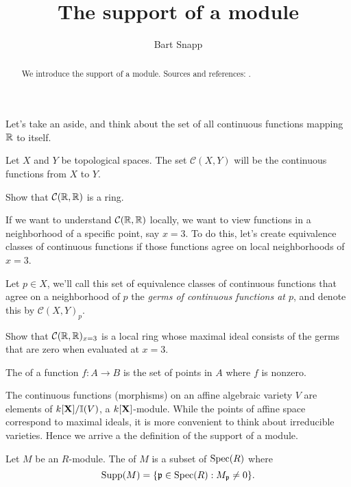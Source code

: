 \documentclass{ximera}
\author{Bart Snapp}
\title{The support of a module}
\begin{document}
\begin{abstract}
  We introduce the support of a module. Sources and references:
  \cite{AM1969, mR1995}.
\end{abstract}
\maketitle

Let's take an aside, and think about the set of all continuous
functions mapping $\mathbb R$ to itself.

\begin{definition}
  Let $X$ and $Y$ be topological spaces. The set $\mathcal{C}(X,Y)$
  will be the continuous functions from $X$ to $Y$.
\end{definition}

\begin{exercise}
  Show that $\mathcal{C}(\mathbb R,\mathbb R)$ is a ring.
\end{exercise}

If we want to understand $\mathcal{C}(\mathbb R,\mathbb R)$ locally, we want to view
functions in a neighborhood of a specific point, say $x=3$. To do
this, let's create equivalence classes of continuous functions if
those functions agree on local neighborhoods of $x=3$.

\begin{definition}
  Let $p\in X$, we'll call this set of equivalence classes of
  continuous functions that agree on a neighborhood of $p$ the
  \textit{germs of continuous functions at $p$}, and denote this by
  $\mathcal{C}(X,Y)_p$.
\end{definition}


\begin{exercise}
  Show that $\mathcal{C}(\mathbb R,\mathbb R)_{x=3}$ is a local ring whose maximal
  ideal consists of the germs that are zero when evaluated at $x=3$.
\end{exercise}


\begin{definition}
  The  of a function $f:A\to B$ is the set of points in $A$
  where $f$ is nonzero. 
\end{definition}

The continuous functions (morphisms) on an affine algebraic variety
$V$ are elements of $k[\mathbf X]/\mathbb I(V)$, a $k[\mathbf X]$-module. While the points
of affine space correspond to maximal ideals, it is more convenient to
think about irreducible varieties. Hence we arrive a the definition of
the support of a module.


\begin{definition}
  Let $M$ be an $R$-module. The  of $M$ is a subset of $\operatorname{Spec}(R)$ where
  \[
  \operatorname{Supp}(M) = \{\mathfrak{p}\in\operatorname{Spec}(R):M_{\mathfrak{p}} \ne 0\}.
  \]
\end{definition}
\end{document}
